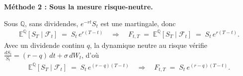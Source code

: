 \textbf{Méthode 2 : Sous la mesure risque-neutre.}

Sous $\mathbb{Q}$, sans dividendes, $e^{-rt}S_t$ est une martingale, donc
\begin{align*}
\mathbb{E}^{\mathbb{Q}}[S_T \mid \mathcal{F}_t] \;=\; S_t\,e^{r(T-t)}
\quad\Longrightarrow\quad
F_{t,T} \;=\; \mathbb{E}^{\mathbb{Q}}[S_T \mid \mathcal{F}_t]
\;=\; S_t\,e^{r(T-t)}.
\end{align*}
Avec un dividende continu $q$, la dynamique neutre au risque vérifie
$\tfrac{dS_t}{S_t}=(r-q)\,dt+\sigma\,dW_t$, d'où
\begin{align*}
\mathbb{E}^{\mathbb{Q}}[S_T \mid \mathcal{F}_t]
\;=\; S_t\,e^{(r-q)(T-t)}
\quad\Longrightarrow\quad
F_{t,T} \;=\; S_t\,e^{(r-q)(T-t)}.
\end{align*}


